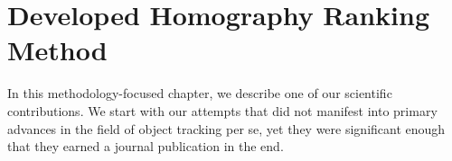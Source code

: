 \chapter{Developed Homography Ranking Method}
\label{chap:HomographyRanking}

In this methodology-focused chapter, we describe one of our scientific contributions. We start with our attempts that did not manifest into primary advances in the field of object tracking per se, yet they were significant enough that they earned a journal publication in the end.







